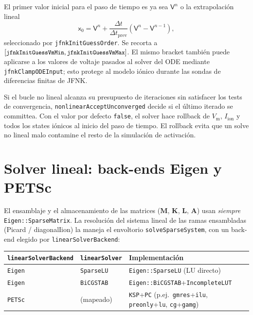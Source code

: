 \documentclass[11pt,a4paper]{article}
\newcommand{\code}[1]{\texttt{\small #1}}
\newcommand{\Vm}{V_{\text{m}}}
\newcommand{\Iion}{I_{\mathrm{ion}}}
\newcommand{\Mmass}{\mathbf{M}}
\newcommand{\Kstif}{\mathbf{K}}
\newcommand{\Lop}{\mathbf{L}}
\newcommand{\Aimp}{\mathbf{A}}
\begin{document}
El primer valor inicial para el paso de tiempo es ya sea $\mathsf{V}^{n}$ o la
extrapolación lineal
\begin{equation}
  \mathsf{x}_{0}
  =
  \mathsf{V}^{n}
  + \frac{\Delta t}{\Delta t_{\mathrm{prev}}}
    \left(\mathsf{V}^{n}-\mathsf{V}^{n-1}\right),
  \label{eq:extrap}
\end{equation}
seleccionado por \code{jfnkInitGuessOrder}. Se recorta a
$[\code{jfnkInitGuessVmMin},\code{jfnkInitGuessVmMax}]$. El mismo bracket también
puede aplicarse a los valores de voltaje pasados al solver del ODE mediante
\code{jfnkClampODEInput}; esto protege al modelo iónico durante las sondas de
diferencias finitas de JFNK.

Si el bucle no lineal alcanza su presupuesto de iteraciones sin satisfacer los tests
de convergencia, \code{nonlinearAcceptUnconverged} decide si el último iterado se
committea. Con el valor por defecto \code{false}, el solver hace rollback de $\Vm$,
$\Iion$ y todos los states iónicos al inicio del paso de tiempo. El rollback evita
que un solve no lineal malo contamine el resto de la simulación de activación.

\section{Solver lineal: back-ends Eigen y PETSc}
\label{sec:linalg}

El ensamblaje y el almacenamiento de las matrices ($\Mmass$, $\Kstif$, $\Lop$,
$\Aimp$) usan \emph{siempre} \code{Eigen::SparseMatrix}. La resolución del sistema
lineal de las ramas ensambladas (Picard / diagonalIion) la maneja el envoltorio
\code{solveSparseSystem}, con un back-end elegido por \code{linearSolverBackend}:

\begin{center}
\begin{tabular}{@{}lll@{}}
\toprule
\code{linearSolverBackend} & \code{linearSolver} & Implementación \\
\midrule
\code{Eigen} & \code{SparseLU}  & \code{Eigen::SparseLU} (LU directo) \\
\code{Eigen} & \code{BiCGSTAB}  & \code{Eigen::BiCGSTAB}+\code{IncompleteLUT} \\
\code{PETSc} & (mapeado)        & \code{KSP}+\code{PC} (p.ej.\ \code{gmres}+\code{ilu},
   \code{preonly}+\code{lu}, \code{cg}+\code{gamg}) \\
\bottomrule
\end{tabular}
\end{center}
\end{document}
